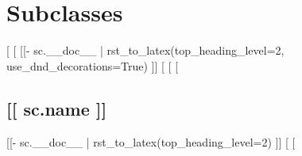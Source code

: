 
\section*{Subclasses}
[%
  [%
    \DndFeatHeader{[[ sc.name ]]} %
    [[- sc.__doc__ | rst_to_latex(top_heading_level=2, use_dnd_decorations=True) ]]
    [%
[%
    [%
    \subsection*{[[ sc.name ]]}
    [[- sc.__doc__ | rst_to_latex(top_heading_level=2) ]]
    [%
[%
